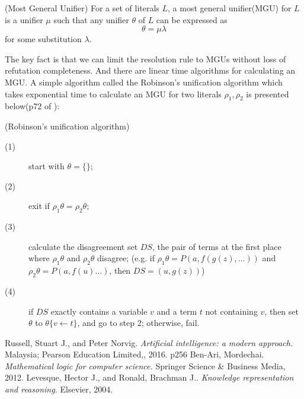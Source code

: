 \documentclass{article}
\begin{document}
\begin{defin}(Most General Unifier)\newline
For a set of literals $L$, a most general unifier(MGU) for $L$ is a unifier $\mu$ such that any unifier $\theta$ of $L$ can be expressed as 
\[
\theta = \mu\lambda
\]
for some substitution $\lambda$.
\end{defin}
The key fact is that we can limit the resolution rule to MGUs without loss of refutation completeness. And there are linear time algorithms for calculating an MGU. A simple algorithm called the Robinson's unification algorithm which takes exponential time to calculate an MGU for two literals $\rho_1,\rho_2$ is presented below(p72 of \cite{example2}):\newline

(Robinson's unification algorithm)
\begin{description}
\item[(1)] start with $\theta = \{\}$;
\item[(2)] exit if $\rho_1 \theta = \rho_2 \theta$;
\item[(3)] calculate the disagreement set $DS$, the pair of terms at the first place where $\rho_1\theta$ and $\rho_2\theta$ disagree; (e.g. if $\rho_1\theta = P(a, f(g(z),\dots))$ and $\rho_2\theta = P(a, f(u)\dots)$, then $DS = (u,g(z))$)
\item[(4)]if $DS$ exactly contains a variable $v$ and a term $t$ not containing $v$, then set $\theta$ to $\theta\{v \leftarrow t\}$, and go to step 2; otherwise, fail.
\end{description}


\begin{thebibliography}{99}
Russell, Stuart J., and Peter Norvig. \textit{Artificial intelligence: a modern approach.} Malaysia; Pearson Education Limited,, 2016. p256
Ben-Ari, Mordechai. \textit{Mathematical logic for computer science.} Springer Science \& Business Media, 2012.
Levesque, Hector J., and Ronald, Brachman J.. \textit{Knowledge representation and reasoning.} Elsevier, 2004.
\end{thebibliography}
\end{document}
